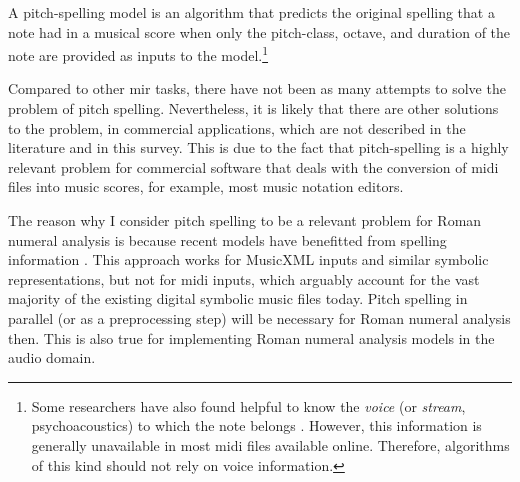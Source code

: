 

A pitch-spelling model is an algorithm that predicts the
original spelling that a note had in a musical score when
only the pitch-class, octave, and duration of the note are
provided as inputs to the model.\footnote{Some researchers
have also found helpful to know the \emph{voice} (or
\emph{stream}, psychoacoustics) to which the note belongs
\parencite{teodoru2007pitch}. However, this information is
generally unavailable in most \gls{midi} files available
online. Therefore, algorithms of this kind should not rely on voice information.}


Compared to other \gls{mir} tasks, there have not been as
many attempts to solve the problem of pitch spelling.
Nevertheless, it is likely that there are other solutions to
the problem, in commercial applications, which are not
described in the literature and in this survey. This is due
to the fact that pitch-spelling is a highly relevant problem
for commercial software that deals with the conversion of
\gls{midi} files into music scores, for example, most music
notation editors.

The reason why I consider pitch spelling to be a relevant
problem for Roman numeral analysis is because recent models
have benefitted from spelling information
\parencite{micchi2020not}. This approach works for MusicXML
inputs and similar symbolic representations, but not for
\gls{midi} inputs, which arguably account for the vast
majority of the existing digital symbolic music files today.
Pitch spelling in parallel (or as a preprocessing step) will
be necessary for Roman numeral analysis then. This is also
true for implementing Roman numeral analysis models in the
audio domain.
